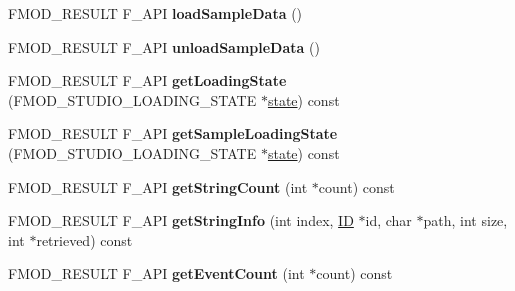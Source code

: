 \begin{DoxyCompactItemize}
\item 
\hypertarget{class_f_m_o_d_1_1_studio_1_1_bank_aeb5c956cc80cbf454971319918fe4cca}{F\+M\+O\+D\+\_\+\+R\+E\+S\+U\+L\+T F\+\_\+\+A\+P\+I {\bfseries load\+Sample\+Data} ()}\label{class_f_m_o_d_1_1_studio_1_1_bank_aeb5c956cc80cbf454971319918fe4cca}

\item 
\hypertarget{class_f_m_o_d_1_1_studio_1_1_bank_a757a10c5680e9a8ab8529f39ef205754}{F\+M\+O\+D\+\_\+\+R\+E\+S\+U\+L\+T F\+\_\+\+A\+P\+I {\bfseries unload\+Sample\+Data} ()}\label{class_f_m_o_d_1_1_studio_1_1_bank_a757a10c5680e9a8ab8529f39ef205754}

\item 
\hypertarget{class_f_m_o_d_1_1_studio_1_1_bank_a7c97cdb287b71688381b5071380afe80}{F\+M\+O\+D\+\_\+\+R\+E\+S\+U\+L\+T F\+\_\+\+A\+P\+I {\bfseries get\+Loading\+State} (F\+M\+O\+D\+\_\+\+S\+T\+U\+D\+I\+O\+\_\+\+L\+O\+A\+D\+I\+N\+G\+\_\+\+S\+T\+A\+T\+E $\ast$\hyperlink{structstate}{state}) const }\label{class_f_m_o_d_1_1_studio_1_1_bank_a7c97cdb287b71688381b5071380afe80}

\item 
\hypertarget{class_f_m_o_d_1_1_studio_1_1_bank_a06378d9cdd5a7040eefe61d4ba750ccc}{F\+M\+O\+D\+\_\+\+R\+E\+S\+U\+L\+T F\+\_\+\+A\+P\+I {\bfseries get\+Sample\+Loading\+State} (F\+M\+O\+D\+\_\+\+S\+T\+U\+D\+I\+O\+\_\+\+L\+O\+A\+D\+I\+N\+G\+\_\+\+S\+T\+A\+T\+E $\ast$\hyperlink{structstate}{state}) const }\label{class_f_m_o_d_1_1_studio_1_1_bank_a06378d9cdd5a7040eefe61d4ba750ccc}

\item 
\hypertarget{class_f_m_o_d_1_1_studio_1_1_bank_ae7a0b72b58aa7616531b8efaa596f74a}{F\+M\+O\+D\+\_\+\+R\+E\+S\+U\+L\+T F\+\_\+\+A\+P\+I {\bfseries get\+String\+Count} (int $\ast$count) const }\label{class_f_m_o_d_1_1_studio_1_1_bank_ae7a0b72b58aa7616531b8efaa596f74a}

\item 
\hypertarget{class_f_m_o_d_1_1_studio_1_1_bank_a52594fcf77dcb66e3ad1e05381ebe129}{F\+M\+O\+D\+\_\+\+R\+E\+S\+U\+L\+T F\+\_\+\+A\+P\+I {\bfseries get\+String\+Info} (int index, \hyperlink{struct_f_m_o_d___g_u_i_d}{I\+D} $\ast$id, char $\ast$path, int size, int $\ast$retrieved) const }\label{class_f_m_o_d_1_1_studio_1_1_bank_a52594fcf77dcb66e3ad1e05381ebe129}

\item 
\hypertarget{class_f_m_o_d_1_1_studio_1_1_bank_abe6fbde090cbc3ded5957ebe680cd2a8}{F\+M\+O\+D\+\_\+\+R\+E\+S\+U\+L\+T F\+\_\+\+A\+P\+I {\bfseries get\+Event\+Count} (int $\ast$count) const }\label{class_f_m_o_d_1_1_studio_1_1_bank_abe6fbde090cbc3ded5957ebe680cd2a8}


\end{DoxyCompactItemize}
